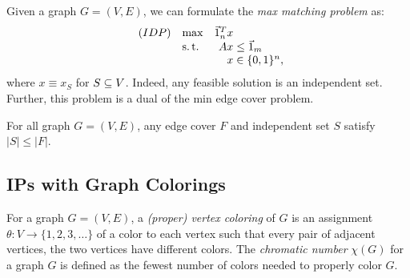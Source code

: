 \begin{defn}
    \label{def:max-ind-set-formulation}
    Given a graph $G=(V,E)$, we can formulate the \textit{max matching problem} as:
        \begin{equation*}
        \begin{array}{llr@{}l@{}}
            (IDP)   & \max  &   \one_n^T x  &               \\
                    & \st   &       Ax      &{}\le \one_m   \\
                    &       &       x       &{}\in \{0,1\}^n,
        \end{array}
        \end{equation*}
    where $x \equiv x_S$ for $S \subseteq V$. Indeed, any feasible solution is an independent set. Further, this problem is a dual of the min edge cover problem.
\end{defn}

\begin{thm}
    \label{thm:weak-duality-min-edge-cover-max-ind-set}
    For all graph $G = (V,E)$, any edge cover $F$ and independent set $S$ satisfy $|S| \le |F|$.
\end{thm}


\subsection{IPs with Graph Colorings}
\label{subsec:ips-with-graph-colorings}

\begin{defn}
    \label{def:vertex-coloring}
    For a graph $G = (V,E)$, a \textit{(proper) vertex coloring} of $G$ is an assignment $\theta: V \rightarrow \{1, 2, 3, \dots\}$ of a color to each vertex such that every pair of adjacent vertices, the two vertices have different colors. The \textit{chromatic number} $\chi(G)$ for a graph $G$ is defined as the fewest number of colors needed to properly color $G$.
\end{defn}

